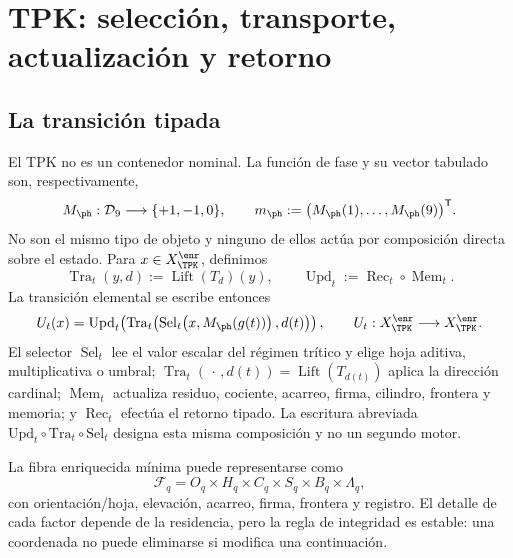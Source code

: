 \chapter{TPK: selección, transporte, actualización y retorno}

\section{La transición tipada}

El TPK no es un contenedor nominal. La función de fase y su vector tabulado
son, respectivamente,
\[
 M_{\ph}:\mathcal D_9\longrightarrow\{+1,-1,0\},
 \qquad
 m_{\ph}:=\bigl(M_{\ph}(1),\ldots,M_{\ph}(9)\bigr)^{\mathsf T}.
\]
No son el mismo tipo de objeto y ninguno de ellos actúa por composición
directa sobre el estado. Para \(x\in X_{\TPK}^{\enr}\), definimos
\[
 \operatorname{Tra}_t(y,d):=\operatorname{Lift}(T_d)(y),
 \qquad
 \operatorname{Upd}_t:=\operatorname{Rec}_t\circ\operatorname{Mem}_t.
\]
La transición elemental se escribe entonces
\begin{equation}
 U_t(x)=\operatorname{Upd}_t\!\left(
 \operatorname{Tra}_t\!\left(
 \operatorname{Sel}_t\!\left(x,M_{\ph}(g(t))\right),d(t)
 \right)\right),
 \qquad
 U_t:X_{\TPK}^{\enr}\longrightarrow X_{\TPK}^{\enr}.
 \label{espiral:eq:transicion-tpk-tipada}
\end{equation}
El selector \(\operatorname{Sel}_t\) lee el valor escalar del régimen
trítico y elige hoja aditiva, multiplicativa o umbral;
\(\operatorname{Tra}_t(\,\cdot\,,d(t))=\operatorname{Lift}(T_{d(t)})\)
aplica la dirección cardinal;
\(\operatorname{Mem}_t\) actualiza residuo, cociente, acarreo, firma,
cilindro, frontera y memoria; y \(\operatorname{Rec}_t\) efectúa el retorno
tipado. La escritura abreviada
\(\mathrm{Upd}_t\circ\mathrm{Tra}_t\circ\mathrm{Sel}_t\) designa esta misma
composición y no un segundo motor.

La fibra enriquecida mínima puede representarse como
\[
 \mathcal F_q=O_q\times H_q\times C_q\times S_q\times B_q\times\Lambda_q,
\]
con orientación/hoja, elevación, acarreo, firma, frontera y registro. El
detalle de cada factor depende de la residencia, pero la regla de integridad
es estable: una coordenada no puede eliminarse si modifica una continuación.

